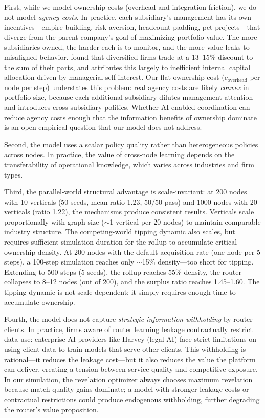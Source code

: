 \documentclass[12pt]{article}
\theoremstyle{definition}
\begin{document}
First, while we model ownership costs (overhead and integration friction), we do not model \textit{agency costs}. In practice, each subsidiary's management has its own incentives---empire-building, risk aversion, headcount padding, pet projects---that diverge from the parent company's goal of maximizing portfolio value. The more subsidiaries owned, the harder each is to monitor, and the more value leaks to misaligned behavior. \citet{berger1995} found that diversified firms trade at a 13--15\% discount to the sum of their parts, and \citet{jensen1986} attributes this largely to inefficient internal capital allocation driven by managerial self-interest. Our flat ownership cost ($c_{\text{overhead}}$ per node per step) understates this problem: real agency costs are likely \textit{convex} in portfolio size, because each additional subsidiary dilutes management attention and introduces cross-subsidiary politics. Whether AI-enabled coordination can reduce agency costs enough that the information benefits of ownership dominate is an open empirical question that our model does not address.

Second, the model uses a scalar policy quality rather than heterogeneous policies across nodes. In practice, the value of cross-node learning depends on the transferability of operational knowledge, which varies across industries and firm types.

Third, the parallel-world structural advantage is scale-invariant: at 200 nodes with 10 verticals (50 seeds, mean ratio 1.23, 50/50 pass) and 1000 nodes with 20 verticals (ratio 1.22), the mechanisms produce consistent results. Verticals scale proportionally with graph size ($\sim$1 vertical per 20 nodes) to maintain comparable industry structure. The competing-world tipping dynamic also scales, but requires sufficient simulation duration for the rollup to accumulate critical ownership density. At 200 nodes with the default acquisition rate (one node per 5 steps), a 100-step simulation reaches only $\sim$15\% density---too short for tipping. Extending to 500 steps (5 seeds), the rollup reaches 55\% density, the router collapses to 8--12 nodes (out of 200), and the surplus ratio reaches 1.45--1.60. The tipping dynamic is not scale-dependent; it simply requires enough time to accumulate ownership.

Fourth, the model does not capture \textit{strategic information withholding} by router clients. In practice, firms aware of router learning leakage contractually restrict data use: enterprise AI providers like Harvey (legal AI) face strict limitations on using client data to train models that serve other clients. This withholding is rational---it reduces the leakage cost---but it also reduces the value the platform can deliver, creating a tension between service quality and competitive exposure. In our simulation, the revelation optimizer always chooses maximum revelation because match quality gains dominate; a model with stronger leakage costs or contractual restrictions could produce endogenous withholding, further degrading the router's value proposition.
\end{document}
